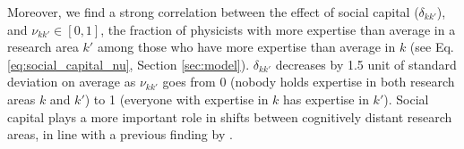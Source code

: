 \documentclass{article}
\begin{document}
Moreover, we find a strong correlation between the effect of social capital ($\delta_{kk'}$), and $\nu_{kk'}\in[0,1]$, the fraction of physicists with more expertise than average in a research area $k'$ among those who have more expertise than average in $k$ (see Eq. \eqref{eq:social_capital_nu}, Section \ref{sec:model}). $\delta_{kk'}$ decreases by 1.5 unit of standard deviation on average as $\nu_{kk'}$ goes from 0 (nobody holds expertise in both research areas $k$ and $k'$) to 1 (everyone with expertise in $k$ has expertise in $k'$). Social capital plays a more important role in shifts between cognitively distant research areas, in line with a previous finding by \citeauthor{Tripodi2020} \citealt{Tripodi2020}.


\end{document}
